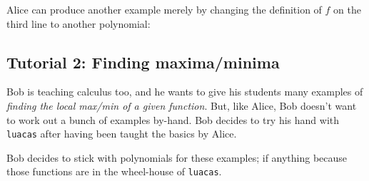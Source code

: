 \documentclass{article}
\begin{document}
Alice can produce another example merely by changing the definition of $f$ on the third line to another polynomial:

\subsection{Tutorial 2: Finding maxima/minima}

Bob is teaching calculus too, and he wants to give his students many examples of \emph{finding the local max/min of a given function}. But, like Alice, Bob doesn't want to work out a bunch of examples by-hand. Bob decides to try his hand with \texttt{luacas} after having been taught the basics by Alice. 

Bob decides to stick with polynomials for these examples; if anything because those functions are in the wheel-house of \texttt{luacas}.
\end{document}
